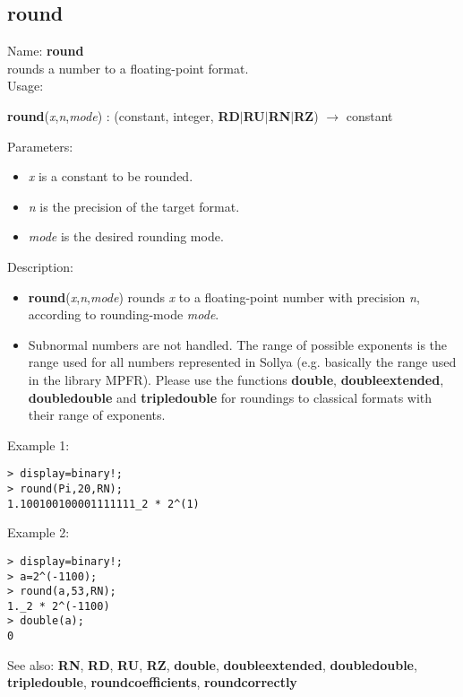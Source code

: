 \subsection{ round }
\noindent Name: \textbf{round}\\
rounds a number to a floating-point format.\\

\noindent Usage: 
\begin{center}
\textbf{round}(\emph{x},\emph{n},\emph{mode}) : (\textsf{constant}, \textsf{integer}, \textbf{RD}$|$\textbf{RU}$|$\textbf{RN}$|$\textbf{RZ}) $\rightarrow$ \textsf{constant}\\
\end{center}
Parameters: 
\begin{itemize}
\item \emph{x} is a constant to be rounded.
\item \emph{n} is the precision of the target format.
\item \emph{mode} is the desired rounding mode.
\end{itemize}
\noindent Description: \begin{itemize}

\item \textbf{round}(\emph{x},\emph{n},\emph{mode}) rounds \emph{x} to a floating-point number with 
   precision \emph{n}, according to rounding-mode \emph{mode}. 

\item Subnormal numbers are not handled. The range of possible exponents is the 
   range used for all numbers represented in Sollya (e.g. basically the range 
   used in the library MPFR). Please use the functions \textbf{double}, \textbf{doubleextended},
   \textbf{doubledouble} and \textbf{tripledouble} for roundings to classical formats with their
   range of exponents.
\end{itemize}
\noindent Example 1: 
\begin{center}\begin{minipage}{15cm}\begin{Verbatim}[frame=single]
> display=binary!;
> round(Pi,20,RN);
1.100100100001111111_2 * 2^(1)
\end{Verbatim}
\end{minipage}\end{center}
\noindent Example 2: 
\begin{center}\begin{minipage}{15cm}\begin{Verbatim}[frame=single]
> display=binary!;
> a=2^(-1100);
> round(a,53,RN);
1._2 * 2^(-1100)
> double(a);
0
\end{Verbatim}
\end{minipage}\end{center}
See also: \textbf{RN}, \textbf{RD}, \textbf{RU}, \textbf{RZ}, \textbf{double}, \textbf{doubleextended}, \textbf{doubledouble}, \textbf{tripledouble}, \textbf{roundcoefficients}, \textbf{roundcorrectly}
